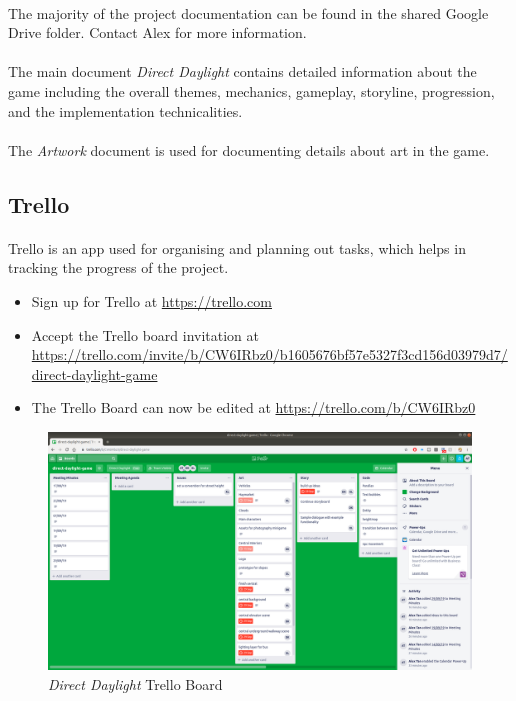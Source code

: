 \documentclass[11pt]{article}
\begin{document}
\paragraph{}
The majority of the project documentation can be found in the shared Google Drive folder. Contact Alex for more information.
\paragraph{}
The main document \textit{Direct Daylight} contains detailed information about the game including the overall themes, mechanics, gameplay, storyline, progression, and the implementation technicalities.
\paragraph{}
The \textit{Artwork} document is used for documenting details about art in the game.
\subsection{Trello}
\paragraph{}
Trello is an app used for organising and planning out tasks, which helps in tracking the progress of the project.
\begin{itemize}
\item Sign up for Trello at \url{https://trello.com}
\item Accept the Trello board invitation at \\ \url{https://trello.com/invite/b/CW6IRbz0/b1605676bf57e5327f3cd156d03979d7/direct-daylight-game}
\item The Trello Board can now be edited at \url{https://trello.com/b/CW6IRbz0}
\end{itemize}
\begin{figure}[H]
\centering
\includegraphics[scale=1.0, width=\textwidth]{latex-images/trello}
\caption{\textit{Direct Daylight} Trello Board}
\end{figure}
\end{document}
